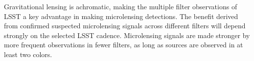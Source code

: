 Gravitational lensing is achromatic, making the multiple filter observations of LSST a key advantage in making microlensing detections.
The benefit derived from confirmed suspected microlensing signals across different filters will depend strongly on the selected LSST cadence. 
Microlensing signals are made stronger by more frequent observations in fewer filters, as long as sources are observed in at least two colors. 





